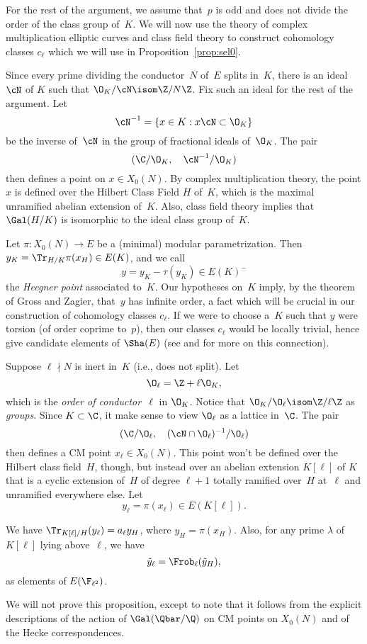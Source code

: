 \documentclass{report}
\begin{document}
For the rest of the argument, we assume that~$p$ is odd and does not
divide the order of the class group of~$K$.  We will now use the
theory of complex multiplication elliptic curves and class field
theory to construct cohomology classes $c_\ell$ which we will use in
Proposition~\ref{prop:sel0}.

Since every prime dividing the conductor~$N$ of~$E$ splits in~$K$,
there is an ideal $\cN$ of $K$ such that $\O_K/\cN\isom \Z/N\Z$.  Fix
such an ideal for the rest of the argument.
Let
$$
\cN^{-1} = \{x \in K : x\cN \subset \O_K\}
$$
be the inverse of~$\cN$ in the group of fractional ideals
of~$\O_K$.
The pair
$$
(\C/\O_K, \quad\cN^{-1}/\O_K)
$$
then defines a point on $x \in X_0(N)$.  By complex multiplication
theory, the point $x$ is defined over the Hilbert Class Field $H$
of~$K$, which is the maximal unramified abelian extension of~$K$.
Also, class field theory implies that $\Gal(H/K)$
is isomorphic to the ideal class group of~$K$.

Let
$\pi :X_0(N)\to E$ be a (minimal) modular parametrization.  Then
$y_K = \Tr_{H/K}\pi(x_H) \in E(K)$, and we call
$$
y = y_K - \tau(y_K) \in E(K)^-
$$ the {\em Heegner point} associated to~$K$.  Our hypotheses on~$K$
imply, by the theorem of Gross and Zagier, that~$y$ has infinite
order, a fact which will be crucial in our construction of cohomology
classes $c_\ell$.  If we were to choose a~$K$ such that $y$ were
torsion (of order coprime to~$p$), then our classes $c_\ell$ would be
locally trivial, hence give candidate elements of $\Sha(E)$ (see
\cite[\S11, pg.~254]{gross:kolyvagin} and \cite{mccallum:kolyvagin}
for more on this connection).

Suppose $\ell\nmid N$ is inert in~$K$ (i.e., does not split).  Let
$$
\O_\ell = \Z + \ell \O_K,
$$
which is the {\em order of conductor~$\ell$} in $\O_K$.
Notice that $\O_K/\O_\ell\isom \Z/\ell\Z$ as {\em groups}.
Since $K\subset \C$, it make sense to view $\O_\ell$ as a lattice in~$\C$.
The pair
$$
(\C/\O_\ell, \quad (\cN\cap \O_\ell)^{-1}/\O_\ell)
$$
then defines a CM point $x_\ell \in X_0(N)$.  This point won't be defined over
the Hilbert class field~$H$, though, but instead over an abelian
extension $K[\ell]$ of $K$ that is a cyclic extension of~$H$ of degree
$\ell+1$ totally ramified over~$H$ at~$\ell$ and unramified
everywhere else.  Let
$$
y_\ell = \pi(x_\ell) \in E(K[\ell]).
$$

\begin{proposition}\label{prop:kolltr}
We have $\Tr_{K[\ell]/H}(y_\ell) = a_\ell y_H$, where $y_H = \pi(x_H)$.
Also, for any prime $\lambda$ of $K[\ell]$ lying above~$\ell$, we have
$$
   \tilde{y}_\ell = \Frob_{\ell}(\tilde{y}_H),
$$
as elements of $E(\F_{\ell^2})$.
\end{proposition}
We will not prove this proposition, except to note that it follows
from the explicit descriptions of the action of $\Gal(\Qbar/\Q)$ on CM
points on $X_0(N)$ and of the Hecke correspondences.
\end{document}
